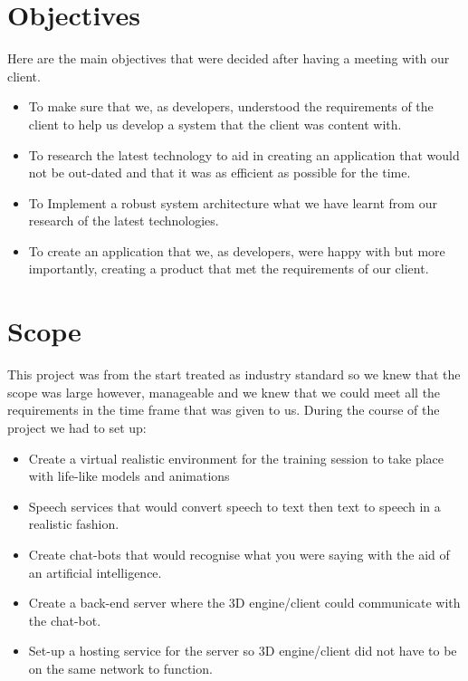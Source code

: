 \section{Objectives}
Here are the main objectives that were decided after having a meeting with our client.

\begin{itemize}
    \item To make sure that we, as developers, understood the requirements of the client to help us develop a system that the client was content with. 
    
    \item To research the latest technology to aid in creating an application that would not be out-dated and that it was as efficient as possible for the time.
    
    \item To Implement a robust system architecture what we have learnt from our research of the latest technologies.
    
    \item To create an application that we, as developers, were happy with but more importantly, creating a product that met the requirements of our client.
    
\end{itemize}

\section{Scope}
This project was from the start treated as industry standard so we knew that the scope was large however, manageable and we knew that we could meet all the requirements in the time frame that was given to us. During the course of the project we had to set up:
\begin{itemize}
    \item Create a virtual realistic environment for the training session to take place with life-like models and animations
    
    \item Speech services that would convert speech to text then text to speech in a realistic fashion.
    
    \item Create chat-bots that would recognise what you were saying with the aid of an artificial intelligence.
    \item Create a back-end server where the 3D engine/client could communicate with the chat-bot.
    
    \item Set-up a hosting service for the server so 3D engine/client did not have to be on the same network to function.
    
\end{itemize}

